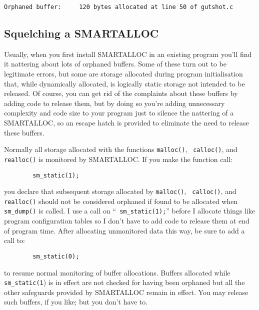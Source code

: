 \footnotesize
\begin{verbatim}
Orphaned buffer:     120 bytes allocated at line 50 of gutshot.c
\end{verbatim}
\normalsize

\subsection{ Squelching a SMARTALLOC}

Usually, when you first install SMARTALLOC in an existing program you'll find
it nattering about lots of orphaned buffers. Some of these turn out to be
legitimate errors, but some are storage allocated during program
initialisation that, while dynamically allocated, is logically static storage
not intended to be released. Of course, you can get rid of the complaints
about these buffers by adding code to release them, but by doing so you're
adding unnecessary complexity and code size to your program just to silence
the nattering of a SMARTALLOC, so an escape hatch is provided to eliminate the
need to release these buffers.

Normally all storage allocated with the functions {\tt malloc()}, {\tt
calloc()}, and {\tt realloc()} is monitored by SMARTALLOC. If you make the
function call:

\footnotesize
\begin{verbatim}
        sm_static(1);
\end{verbatim}
\normalsize

you declare that subsequent storage allocated by {\tt malloc()}, {\tt
calloc()}, and {\tt realloc()} should not be considered orphaned if found to
be allocated when {\tt sm\_dump()} is called. I use a call on ``{\tt
sm\_static(1);}'' before I allocate things like program configuration tables
so I don't have to add code to release them at end of program time. After
allocating unmonitored data this way, be sure to add a call to:

\footnotesize
\begin{verbatim}
        sm_static(0);
\end{verbatim}
\normalsize

to resume normal monitoring of buffer allocations. Buffers allocated while
{\tt sm\_static(1}) is in effect are not checked for having been orphaned but
all the other safeguards provided by SMARTALLOC remain in effect. You may
release such buffers, if you like; but you don't have to.


